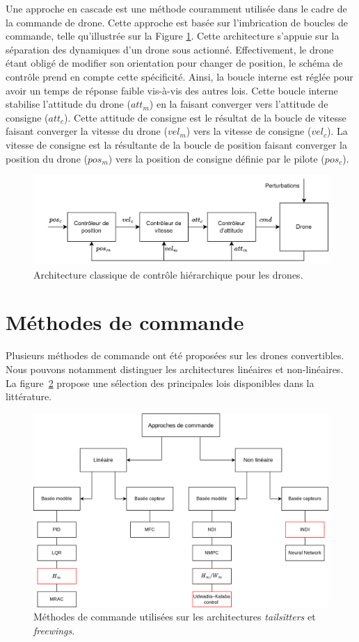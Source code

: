 Une approche en cascade est une méthode couramment utilisée dans le cadre de la commande de drone. Cette approche est basée sur l'imbrication de boucles de  commande, telle qu'illustrée sur la Figure \ref{fig:schemahiera}. 
Cette architecture s'appuie sur la séparation des dynamiques d'un drone sous actionné. Effectivement, le drone étant obligé de modifier son orientation pour changer de position, le schéma de contrôle prend en compte cette spécificité. Ainsi, la boucle interne est réglée pour avoir un temps de réponse faible vis-à-vis des autres lois. Cette boucle interne stabilise l'attitude du drone ($att_{m}$) en la faisant converger vers l'attitude de consigne ($att_{c}$). Cette attitude de consigne est le résultat de la boucle de vitesse faisant converger la vitesse du drone ($vel_{m}$) vers la vitesse de consigne ($vel_{c}$). La vitesse de consigne est la résultante de la boucle de position faisant converger la position du drone ($pos_{m}$) vers la position de consigne définie par le pilote ($pos_{c}$).
\begin{figure}[ht!]
    \centerline{
    \includegraphics[trim=0cm 0cm 0cm 0cm,clip,width=0.8\columnwidth]{figures/controlhierachique.png}}
    \caption{Architecture classique de contrôle hiérarchique pour les drones.}
    \label{fig:schemahiera}
\end{figure}


\section{Méthodes de commande}
Plusieurs méthodes de commande ont été proposées sur les drones convertibles. Nous pouvons notamment distinguer les architectures linéaires et non-linéaires. La figure~\ref{fig:methodecmd} propose une sélection des principales lois disponibles dans la littérature.

\begin{figure}[ht!]
    \centerline{
    \includegraphics[trim=0cm 0cm 0cm 0cm,clip,width=0.8\columnwidth]{figures/controle_methode.png}}
    \caption{Méthodes de commande utilisées sur les architectures \textit{tailsitters} et \textit{freewings}.}
    \label{fig:methodecmd}
\end{figure}


